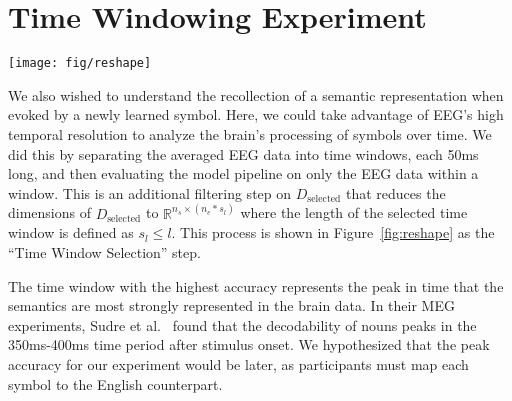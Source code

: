 \section{Time Windowing Experiment}
\begin{figure*}[t]
  \centerline{
    \texttt{[image: fig/reshape]}
  }
  \caption{The data reshaping pipeline. Averaged trial data from $D_{\text{selected}}$ can be directly passed to the reshaping process, or it can be passed through another selection. We can perform two types of selection, one for time analysis or one for channel analysis. We reshaped to flatten across the electrode dimension, such that our training data for the model is $n_s \times (n_e * l)$.}
  \label{fig:reshape}
\end{figure*}

We also wished to understand the recollection of a semantic representation when evoked by a newly learned symbol. Here, we could take advantage of EEG's high temporal resolution to analyze the brain's processing of symbols over time. We did this by separating the averaged EEG data into time windows, each 50ms long, and then evaluating the model pipeline on only the EEG data within a window. This is an additional filtering step on $D_{\text{selected}}$ that reduces the dimensions of $D_\text{selected}$ to $\mathbb{R}^{n_s \times (n_e * s_l)}$ where the length of the selected time window is defined as $s_l \leq l$. This process is shown in Figure~\ref{fig:reshape} as the ``Time Window Selection'' step. 

The time window with the highest accuracy represents the peak in time that the semantics are most strongly represented in the brain data. In their MEG experiments, Sudre et al.~\cite{Sudre2012} found that the decodability of nouns peaks in the 350ms-400ms time period after stimulus onset. We hypothesized that the peak accuracy for our experiment would be later, as participants must map each symbol to the English counterpart.
